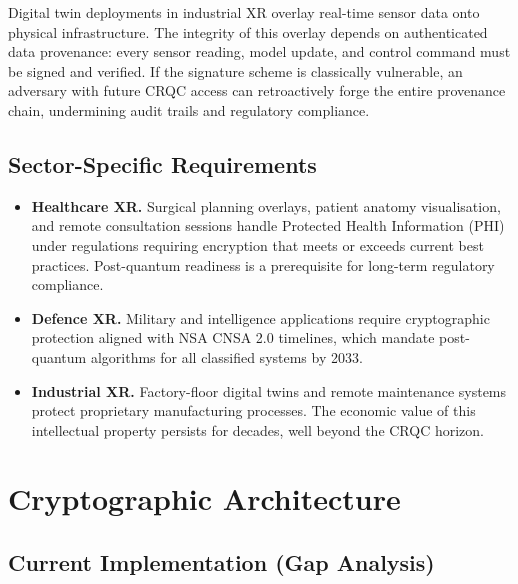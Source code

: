 \documentclass[11pt, a4paper]{article}
\begin{document}
Digital twin deployments in industrial XR overlay real-time sensor data onto physical infrastructure. The integrity of this overlay depends on authenticated data provenance: every sensor reading, model update, and control command must be signed and verified. If the signature scheme is classically vulnerable, an adversary with future CRQC access can retroactively forge the entire provenance chain, undermining audit trails and regulatory compliance.

\subsection{Sector-Specific Requirements}\label{sec:xr-sectors}

\begin{itemize}
    \item \textbf{Healthcare XR.} Surgical planning overlays, patient anatomy visualisation, and remote consultation sessions handle Protected Health Information (PHI) under regulations requiring encryption that meets or exceeds current best practices. Post-quantum readiness is a prerequisite for long-term regulatory compliance.
    \item \textbf{Defence XR.} Military and intelligence applications require cryptographic protection aligned with NSA CNSA 2.0 timelines, which mandate post-quantum algorithms for all classified systems by 2033.
    \item \textbf{Industrial XR.} Factory-floor digital twins and remote maintenance systems protect proprietary manufacturing processes. The economic value of this intellectual property persists for decades, well beyond the CRQC horizon.
\end{itemize}


\section{Cryptographic Architecture}\label{cryptographic-architecture}

\subsection{Current Implementation (Gap Analysis)}\label{current-implementation-gap-analysis}
\end{document}
